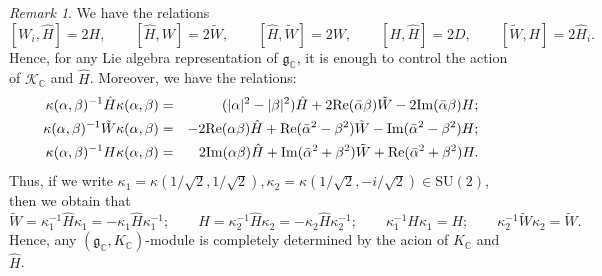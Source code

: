 \documentclass{amsart}
\theoremstyle{definition}
\theoremstyle{remark}
\newtheorem{remark}[theorem]{Remark}
\numberwithin{equation}{section}
\newcommand{\SU}{{\mathrm{SU}}}
\newcommand{\C}{{\mathbb C}}
\newcommand{\cK}{{\mathcal K}}
\newcommand{\mfg}{{\mathfrak g}}
\begin{document}
\begin{remark}\label{relLiealg}
    We have the relations 
    \[
    [W_i,\hat H]=2H, \qquad [\hat H,W]=2\tilde W,\qquad [\hat H,\tilde W]=2W,\qquad [H,\hat H]=2D,\qquad [\tilde W,H]=2\hat H_i.
    \]
    Hence, for any Lie algebra representation of $\mfg_\C$, it is enough to control the action of $\cK_\C$ and $\hat H$. Moreover, we have the relations:
    \begin{eqnarray*}
        \kappa(\alpha,\beta)^{-1}\hat H\kappa(\alpha,\beta)&=&(|\alpha|^2-|\beta|^2)\hat H+2{\rm Re}(\bar \alpha\beta)\tilde W-2{\rm Im}(\bar\alpha\beta)H;\\
        \kappa(\alpha,\beta)^{-1}\tilde W\kappa(\alpha,\beta)&=&-2{\rm Re}(\alpha\beta)\hat H+{\rm Re}(\bar \alpha^2-\beta^2)\tilde W-{\rm Im}(\bar\alpha^2-\beta^2)H;\\
        \kappa(\alpha,\beta)^{-1}H\kappa(\alpha,\beta)&=&2{\rm Im}(\alpha\beta)\hat H+{\rm Im}(\bar \alpha^2+\beta^2)\tilde W+{\rm Re}(\bar\alpha^2+\beta^2)H.
    \end{eqnarray*}
    Thus, if we write $\kappa_1=\kappa(1/\sqrt{2},1/\sqrt{2}),\kappa_2=\kappa(1/\sqrt{2},-i/\sqrt{2})\in \SU(2)$, then we obtain that
    \[
    \tilde W=\kappa_1^{-1}\hat H\kappa_1=-\kappa_1\hat H\kappa_1^{-1};\qquad H=\kappa_2^{-1}\hat H\kappa_2=-\kappa_2\hat H\kappa_2^{-1};\qquad \kappa_1^{-1} H\kappa_1=H;\qquad \kappa_2^{-1}\tilde W\kappa_2=\tilde W.
    \]
    Hence, any $(\mfg_\C,K_\C)$-module is completely determined by the acion of $K_\C$ and $\hat H$.
\end{remark}
\end{document}
